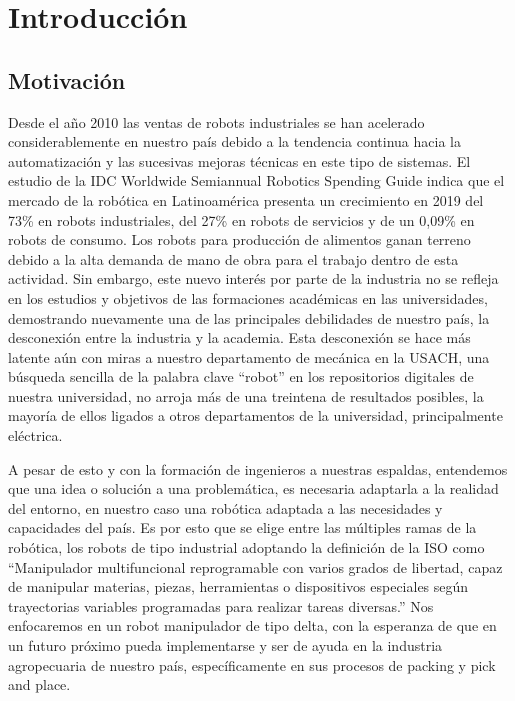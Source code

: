 \chapter{Introducción}\label{CAP1}

\section{Motivación}

Desde el año 2010 las ventas de robots industriales se han acelerado considerablemente en nuestro país debido a la tendencia continua hacia la automatización y las sucesivas mejoras técnicas en este tipo de sistemas. El estudio de la IDC Worldwide Semiannual Robotics Spending Guide \cite{IDC} indica que el mercado de la robótica en Latinoamérica presenta un crecimiento en 2019 del 73\% en robots industriales, del 27\% en robots de servicios y de un 0,09\% en robots de consumo. Los robots para producción de alimentos ganan terreno debido a la alta demanda de mano de obra para el trabajo dentro de esta actividad. Sin embargo, este nuevo interés por parte de la industria no se refleja en los estudios y objetivos de las formaciones académicas en las universidades, demostrando nuevamente una de las principales debilidades de nuestro país, la desconexión entre la industria y la academia. Esta desconexión se hace más latente aún con miras a nuestro departamento de mecánica en la USACH, una búsqueda sencilla de la palabra clave “robot” en los repositorios digitales de nuestra universidad, no arroja más de una treintena de resultados posibles, la mayoría de ellos ligados a otros departamentos de la universidad, principalmente eléctrica.

A pesar de esto y con la formación de ingenieros a nuestras espaldas, entendemos que una idea o solución a una problemática, es necesaria adaptarla a la realidad del entorno, en nuestro caso una robótica adaptada a las necesidades y capacidades del país. Es por esto que se elige entre las múltiples ramas de la robótica, los robots de tipo industrial adoptando la definición de la ISO como “Manipulador multifuncional reprogramable con varios grados de libertad, capaz de manipular materias, piezas, herramientas o dispositivos especiales según trayectorias variables programadas para realizar tareas diversas.” Nos enfocaremos en un robot manipulador de tipo delta, con la esperanza de que en un futuro próximo pueda implementarse y ser de ayuda en la industria agropecuaria de nuestro país, específicamente en sus procesos de packing y pick and place.

